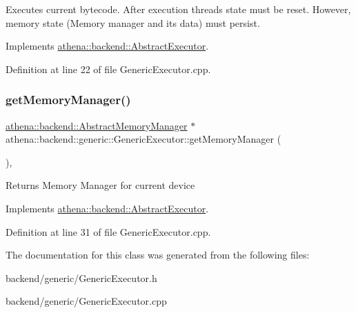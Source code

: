 Executes current bytecode. After execution threads state must be reset. However, memory state (Memory manager and its data) must persist. 

Implements \mbox{\hyperlink{classathena_1_1backend_1_1_abstract_executor_a5f179146ae76002b678a4862553f87ce}{athena\+::backend\+::\+Abstract\+Executor}}.



Definition at line 22 of file Generic\+Executor.\+cpp.

\mbox{\label{classathena_1_1backend_1_1generic_1_1_generic_executor_a0560a1dfc0c70ebef0b5be26bb82b9c5}} 
\subsubsection{\texorpdfstring{get\+Memory\+Manager()}{getMemoryManager()}}
{\footnotesize\ttfamily \mbox{\hyperlink{classathena_1_1backend_1_1_abstract_memory_manager}{athena\+::backend\+::\+Abstract\+Memory\+Manager}} $\ast$ athena\+::backend\+::generic\+::\+Generic\+Executor\+::get\+Memory\+Manager (\begin{DoxyParamCaption}{ }\end{DoxyParamCaption})\hspace{0.3cm}{\ttfamily [override]}, {\ttfamily [virtual]}}

\begin{DoxyReturn}{Returns}
Memory Manager for current device 
\end{DoxyReturn}


Implements \mbox{\hyperlink{classathena_1_1backend_1_1_abstract_executor_a6d61486e2a06500c9c0aa1e03a475e4a}{athena\+::backend\+::\+Abstract\+Executor}}.



Definition at line 31 of file Generic\+Executor.\+cpp.



The documentation for this class was generated from the following files\+:\begin{DoxyCompactItemize}
\item 
backend/generic/Generic\+Executor.\+h\item 
backend/generic/Generic\+Executor.\+cpp\end{DoxyCompactItemize}
